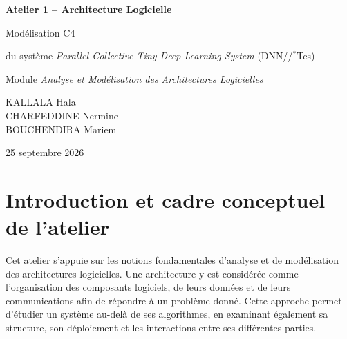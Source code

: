 \documentclass[11pt,a4paper]{article}
\begin{document}
\begin{titlepage}
\centering
\vspace*{1.5cm}
{\LARGE\bfseries Atelier 1 -- Architecture Logicielle\par}
\vspace{0.5cm}
{\Large Modélisation C4\par
du système \emph{Parallel Collective Tiny Deep Learning System} (DNN//$^{*}$Tcs)\par}
\vspace{1.5cm}

{\large Module \emph{Analyse et Modélisation des Architectures Logicielles}\par
KALLALA Hala\\
CHARFEDDINE Nermine\\
BOUCHENDIRA Mariem\\
\par}
\vspace{1cm}
{\large 25 septembre 2026\par}

\vfill

\begin{abstract}
\noindent Ce rapport analyse l'article \emph{« Parallel Collective Tiny Deep Learning System for Face and Object Reidentification in Uncontrolled Environments »} (Helaoui \& Bahroun, Research Square, 2025) à la lumière du vocabulaire et de la taxonomie du Chapitre I du cours (styles architecturaux, distinction architecture matérielle/logicielle, Intelligence Artificielle Distribuée). Il propose ensuite une nouvelle architecture modélisée avec le C4 Model, qui corrige les limites identifiées de l'architecture existante . Un protocole de validation qualitatif et quantitatif est enfin proposé.
\end{abstract}
\end{titlepage}

\tableofcontents
\newpage

\section{Introduction et cadre conceptuel de l'atelier}

Cet atelier s'appuie sur les notions fondamentales d'analyse et de modélisation des architectures logicielles. Une architecture y est considérée comme l'organisation des composants logiciels, de leurs données et de leurs communications afin de répondre à un problème donné. Cette approche permet d'étudier un système au-delà de ses algorithmes, en examinant également sa structure, son déploiement et les interactions entre ses différentes parties.
\end{document}
